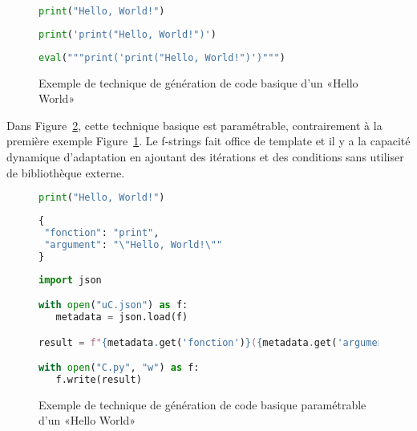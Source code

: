 \begin{figure}
\begin{lstlisting}[language=Python, upquote=true, caption={C de Figure~\ref{fig:exemple_gen_code_basique}}, label={lst:gen_code_basique_c}]
print("Hello, World!")
\end{lstlisting}

\begin{lstlisting}[language=Python, upquote=true, caption={µ$_C$ de Figure~\ref{fig:exemple_gen_code_basique}}, label={lst:gen_code_basique_uc}]
print('print("Hello, World!")')
\end{lstlisting}

\begin{lstlisting}[language=Python, upquote=true, caption={M(µ$_C$) de Figure~\ref{fig:exemple_gen_code_basique}}, label={lst:gen_code_basique_m}]
eval("""print('print("Hello, World!")')""")
\end{lstlisting}
\caption{Exemple de technique de génération de code basique d'un «Hello World»}
\label{fig:exemple_gen_code_basique}
\end{figure}

Dans Figure~\ref{fig:exemple_gen_code_basique_2}, cette technique basique est paramétrable, contrairement à la première exemple Figure~\ref{fig:exemple_gen_code_basique}. Le f-strings fait office de template et il y a la capacité dynamique d’adaptation en ajoutant des itérations et des conditions sans utiliser de bibliothèque externe.

\begin{figure}
\begin{lstlisting}[language=Python, upquote=true, caption={C - fichier C.py de Figure~\ref{fig:exemple_gen_code_basique_2}}, label={lst:gen_code_basique_2_c}]
print("Hello, World!")
\end{lstlisting}

\begin{lstlisting}[language=Python, upquote=true, caption={µ$_C$ - fichier uC.json de Figure~\ref{fig:exemple_gen_code_basique_2}}, label={lst:gen_code_basique_2_uc}]
{
 "fonction": "print",
 "argument": "\"Hello, World!\""
}
\end{lstlisting}

\begin{lstlisting}[language=Python, upquote=true, caption={M(µ$_C$) de Figure~\ref{fig:exemple_gen_code_basique_2}}, label={lst:gen_code_basique_2_m}]
import json

with open("uC.json") as f:
   metadata = json.load(f)

result = f"{metadata.get('fonction')}({metadata.get('argument')})\n"

with open("C.py", "w") as f:
   f.write(result)
\end{lstlisting}
\caption{Exemple de technique de génération de code basique paramétrable d'un «Hello World»}
\label{fig:exemple_gen_code_basique_2}
\end{figure}

